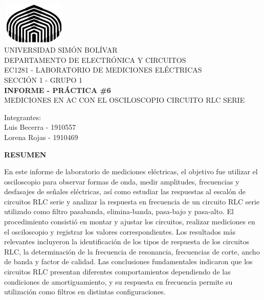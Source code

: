 \documentclass[12pt]{article}
\begin{document}
	
    \thispagestyle{empty}
	
    \begin{center}
        \includegraphics[width=3.1cm,height=2cm]{logo}\\
        UNIVERSIDAD SIMÓN BOLÍVAR\\
        DEPARTAMENTO DE ELECTRÓNICA Y CIRCUITOS\\
        EC1281 - LABORATORIO DE MEDICIONES ELÉCTRICAS\\
        SECCIÓN 1 - GRUPO 1\\
        
        \vspace{7cm}
        \textbf{\Large INFORME - PRÁCTICA \#6}\\
        MEDICIONES EN AC CON EL OSCILOSCOPIO CIRCUITO RLC SERIE\\
    \end{center}
    
    \begin{flushleft}
        \vspace{9cm}
        \hfill Integrantes:\\
        \hfill {\large Luis Becerra - 1910557}\\
        \hfill {\large Lorena Rojas - 1910469}\\
    \end{flushleft}
    
    \newpage
    
        \setcounter{page}{2}
    
    \begin{center}
        \textbf{\large RESUMEN}\\
    \end{center}
	
    En este informe de laboratorio de mediciones eléctricas, el objetivo fue utilizar el osciloscopio para observar formas de onda, medir amplitudes, frecuencias y desfasajes de señales eléctricas, así como estudiar las respuestas al escalón de circuitos RLC serie y analizar la respuesta en frecuencia de un circuito RLC serie utilizado como filtro pasabanda, elimina-banda, pasa-bajo y pasa-alto. El procedimiento consistió en montar y ajustar los circuitos, realizar mediciones en el osciloscopio y registrar los valores correspondientes. Los resultados más relevantes incluyeron la identificación de los tipos de respuesta de los circuitos RLC, la determinación de la frecuencia de resonancia, frecuencias de corte, ancho de banda y factor de calidad. Las conclusiones fundamentales indicaron que los circuitos RLC presentan diferentes comportamientos dependiendo de las condiciones de amortiguamiento, y su respuesta en frecuencia permite su utilización como filtros en distintas configuraciones. 
    
\end{document}
